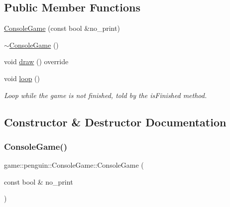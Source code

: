 \subsection*{Public Member Functions}
\begin{DoxyCompactItemize}
\item 
\hyperlink{classgame_1_1penguin_1_1_console_game_ac6ac2ce8f015a83682f7022c268c5efb}{Console\+Game} (const bool \&no\+\_\+print)
\item 
\hyperlink{classgame_1_1penguin_1_1_console_game_a5042c8fd8579ed3ddabc6accac6d3cff}{$\sim$\+Console\+Game} ()
\item 
void \hyperlink{classgame_1_1penguin_1_1_console_game_a71c697742201f71b29327bf8554c2ef0}{draw} () override
\item 
void \hyperlink{classgame_1_1penguin_1_1_console_game_a56af132d8e3d16902fb46b7979d37eae}{loop} ()
\begin{DoxyCompactList}\small\item\em Loop while the game is not finished, told by the {\ttfamily is\+Finished} method. \end{DoxyCompactList}\end{DoxyCompactItemize}


\subsection{Constructor \& Destructor Documentation}
\mbox{\label{classgame_1_1penguin_1_1_console_game_ac6ac2ce8f015a83682f7022c268c5efb}} 
\subsubsection{\texorpdfstring{Console\+Game()}{ConsoleGame()}}
{\footnotesize\ttfamily game\+::penguin\+::\+Console\+Game\+::\+Console\+Game (\begin{DoxyParamCaption}\item[{const bool \&}]{no\+\_\+print }\end{DoxyParamCaption})}

